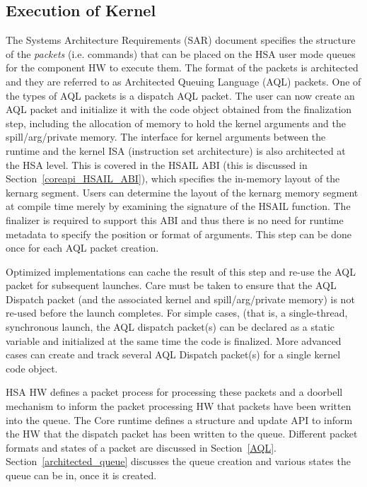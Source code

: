 \subsection{Execution of Kernel}
The Systems Architecture Requirements (SAR) document specifies the
structure of the \emph{packets} (i.e. commands) that can be placed on
the HSA user mode queues for the component HW to execute them. The
format of the packets is architected and they are referred to as
Architected Queuing Language (AQL) packets. One of the types of AQL
packets is a dispatch AQL packet.
The user can now create an AQL packet
and initialize it with the code object obtained from the
finalization step, including the
allocation of memory to hold the kernel arguments and the
spill/arg/private memory. 
The interface for kernel arguments between the runtime and the
kernel I\-S\-A (instruction set architecture) is also architected at
the H\-S\-A level. This is covered in the H\-S\-A\-I\-L A\-B\-I
(this is discussed in
Section~\ref{coreapi_HSAIL_ABI}),
which specifies the in-\/memory layout of the kernarg segment. Users
can determine the layout of the kernarg memory segment at compile
time merely by examining the signature of the H\-S\-A\-I\-L
function. The finalizer is required to support this A\-B\-I and thus
there is no need for runtime metadata to specify the position or
format of arguments.
This step can be done once for each A\-Q\-L packet creation.

Optimized implementations can cache the
result of this step and re-\/use the A\-Q\-L packet for subsequent
launches. Care must be taken to ensure that the A\-Q\-L Dispatch
packet (and the associated kernel and spill/arg/private memory) is
not re-\/used before the launch completes. For simple cases, (that
is, a single-\/thread, synchronous launch, the
AQL dispatch packet(s) can be declared as a static variable
and initialized at the same time the code is finalized. More
advanced cases can create and track several
AQL Dispatch packet(s) for a single kernel code object.

HSA HW defines a packet process for processing these packets and a doorbell
mechanism to inform the packet processing HW that packets have been
written into the queue. The Core runtime defines a structure and update
API to inform the HW that the dispatch packet has been written to the
queue. Different packet formats and states of a packet are discussed
in Section~\ref{AQL}. Section~\ref{architected_queue} discusses the
queue creation and various states the queue can be in, once it is
created.

